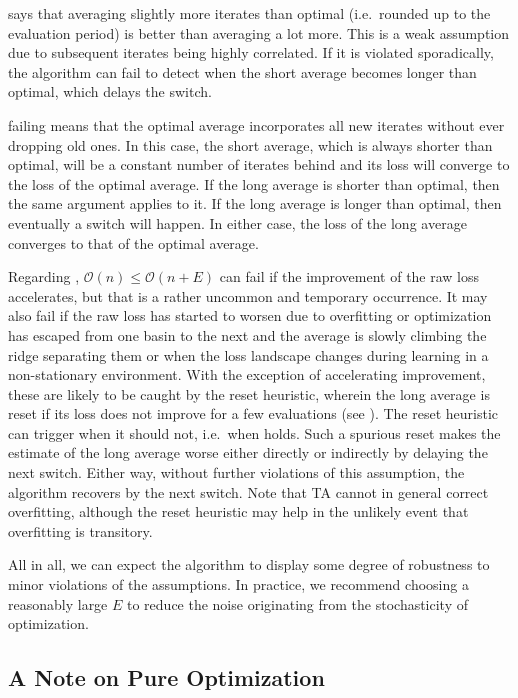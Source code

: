 \documentclass[twocolumn]{article}
\newcommand{\OL}{\mathcal{O}}
\newcommand{\tta}{\textlf{2}TA}
\begin{document}
 says that averaging slightly more iterates than optimal (i.e.\ rounded up to the evaluation period) is better than averaging a lot more.
This is a weak assumption due to subsequent iterates being highly correlated.
If it is violated sporadically, the algorithm can fail to detect when the short average becomes longer than optimal, which delays the switch.

 failing means that the optimal average incorporates all new iterates without ever dropping old ones.
In this case, the short average, which is always shorter than optimal, will be a constant number of iterates behind and its loss will converge to the loss of the optimal average.
If the long average is shorter than optimal, then the same argument applies to it.
If the long average is longer than optimal, then eventually a switch will happen.
In either case, the loss of the long average converges to that of the optimal average.

Regarding , $\OL(n) \leq \OL(n+E)$ can fail if the improvement of the raw loss accelerates, but that is a rather uncommon and temporary occurrence.
It may also fail if the raw loss has started to worsen due to overfitting or optimization has escaped from one basin to the next and the average is slowly climbing the ridge separating them or when the loss landscape changes during learning in a non-stationary environment.
With the exception of accelerating improvement, these are likely to be caught by the reset heuristic, wherein the long average is reset if its loss does not improve for a few evaluations (see ).
The reset heuristic can trigger when it should not, i.e.\ when  holds.
Such a spurious reset makes the estimate of the long average worse either directly or indirectly by delaying the next switch.
Either way, without further violations of this assumption, the algorithm recovers by the next switch.
Note that \tta{} cannot in general correct overfitting, although the reset heuristic may help in the unlikely event that overfitting is transitory.

All in all, we can expect the algorithm to display some degree of robustness to minor violations of the assumptions.
In practice, we recommend choosing a reasonably large $E$ to reduce the noise originating from the stochasticity of optimization.

\subsection{A Note on Pure Optimization}
\label{sec:tta-pure-optimization}
\end{document}
